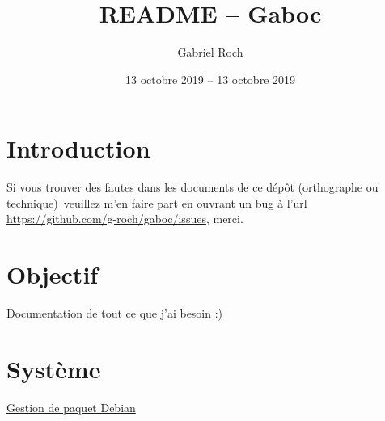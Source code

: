 


\title{README -- Gaboc}
\author{Gabriel Roch}
\date{13 octobre 2019 -- 13 octobre 2019}



\maketitle
\tableofcontents

\section{Introduction}

Si vous trouver des fautes dans les documents de ce dépôt (orthographe ou 
technique) veuillez m'en faire part en ouvrant un bug à l'url 
\url{https://github.com/g-roch/gaboc/issues}, merci.

\section{Objectif}

Documentation de tout ce que j'ai besoin :)

\section{Système}
\href{debian-package-manage.\format}{Gestion de paquet Debian}



